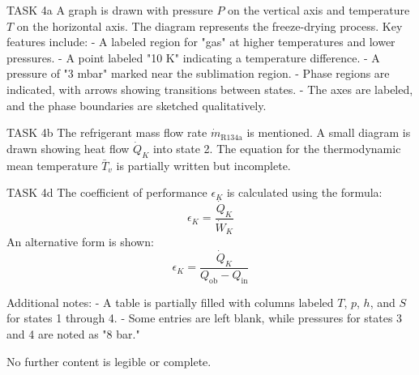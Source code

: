 TASK 4a  
A graph is drawn with pressure \( P \) on the vertical axis and temperature \( T \) on the horizontal axis. The diagram represents the freeze-drying process. Key features include:  
- A labeled region for "gas" at higher temperatures and lower pressures.  
- A point labeled "10 K" indicating a temperature difference.  
- A pressure of "3 mbar" marked near the sublimation region.  
- Phase regions are indicated, with arrows showing transitions between states.  
- The axes are labeled, and the phase boundaries are sketched qualitatively.  

TASK 4b  
The refrigerant mass flow rate \( \dot{m}_{\text{R134a}} \) is mentioned. A small diagram is drawn showing heat flow \( \dot{Q}_K \) into state 2.  
The equation for the thermodynamic mean temperature \( \bar{T}_v \) is partially written but incomplete.  

TASK 4d  
The coefficient of performance \( \epsilon_K \) is calculated using the formula:  
\[
\epsilon_K = \frac{\dot{Q}_K}{\dot{W}_K}
\]  
An alternative form is shown:  
\[
\epsilon_K = \frac{\dot{Q}_K}{Q_{\text{ob}} - Q_{\text{in}}}
\]  

Additional notes:  
- A table is partially filled with columns labeled \( T \), \( p \), \( h \), and \( S \) for states 1 through 4.  
- Some entries are left blank, while pressures for states 3 and 4 are noted as "8 bar."  

No further content is legible or complete.